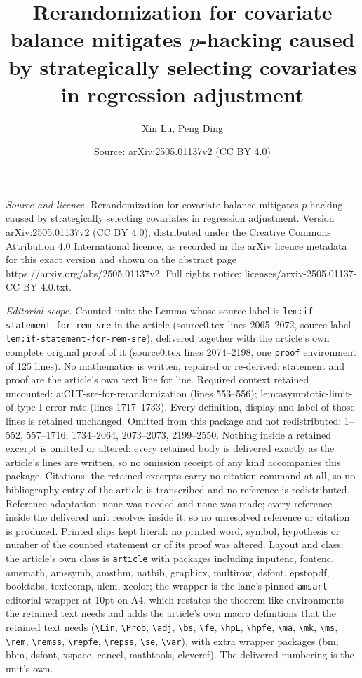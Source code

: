 \documentclass[10pt,a4paper]{amsart}
\title[Rerandomization for covariate balance mitigates $p$-hacking ]{Rerandomization for covariate balance mitigates $p$-hacking caused by strategically selecting covariates in regression adjustment}
\author{Xin Lu, Peng Ding}
\date{Source: arXiv:2505.01137v2 (CC BY 4.0)}
\begin{document}
\maketitle

\noindent\emph{Source and licence.} Rerandomization for covariate balance mitigates $p$-hacking caused by strategically selecting covariates in regression adjustment. Version arXiv:2505.01137v2 (CC BY 4.0), distributed under the Creative Commons Attribution 4.0 International licence, as recorded in the arXiv licence metadata for this exact version and shown on the abstract page https://arxiv.org/abs/2505.01137v2. Full rights notice: licenses/arxiv-2505.01137-CC-BY-4.0.txt.\par\smallskip

\noindent\textit{Editorial scope.} Counted unit: the Lemma whose source label is \texttt{lem:if-statement-for-rem-sre} in the article (source0.tex lines 2065--2072, source label \texttt{lem:if-statement-for-rem-sre}), delivered together with the article's own complete original proof of it (source0.tex lines 2074--2198, one \texttt{proof} environment of 125 lines). No mathematics is written, repaired or re-derived: statement and proof are the article's own text line for line. Required context retained uncounted: a:CLT-sre-for-rerandomization (lines 553--556); lem:asymptotic-limit-of-type-I-error-rate (lines 1717--1733). Every definition, display and label of those lines is retained unchanged. Omitted from this package and not redistributed: 1--552, 557--1716, 1734--2064, 2073--2073, 2199--2550. Nothing inside a retained excerpt is omitted or altered: every retained body is delivered exactly as the article's lines are written, so no omission receipt of any kind accompanies this package. Citations: the retained excerpts carry no citation command at all, so no bibliography entry of the article is transcribed and no reference is redistributed. Reference adaptation: none was needed and none was made; every reference inside the delivered unit resolves inside it, so no unresolved reference or citation is produced. Printed slips kept literal: no printed word, symbol, hypothesis or number of the counted statement or of its proof was altered. Layout and class: the article's own class is \texttt{article} with packages including inputenc, fontenc, amsmath, amssymb, amsthm, natbib, graphicx, multirow, dsfont, epstopdf, booktabs, textcomp, ulem, xcolor; the wrapper is the lane's pinned \texttt{amsart} editorial wrapper at 10pt on A4, which restates the theorem-like environments the retained text needs and adds the article's own macro definitions that the retained text needs (\texttt{\textbackslash Lin}, \texttt{\textbackslash Prob}, \texttt{\textbackslash adj}, \texttt{\textbackslash bs}, \texttt{\textbackslash fe}, \texttt{\textbackslash hpL}, \texttt{\textbackslash hpfe}, \texttt{\textbackslash ma}, \texttt{\textbackslash mk}, \texttt{\textbackslash ms}, \texttt{\textbackslash rem}, \texttt{\textbackslash remss}, \texttt{\textbackslash repfe}, \texttt{\textbackslash repss}, \texttt{\textbackslash se}, \texttt{\textbackslash var}), with extra wrapper packages (bm, bbm, dsfont, xspace, cancel, mathtools, cleveref). The delivered numbering is the unit's own. 
\end{document}
